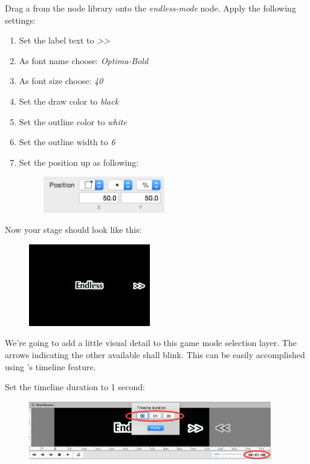 \begin{leftbar}
Drag a \cclabel{} from the node library onto the \textit{endless-mode} node.
Apply the following settings:
\begin{enumerate}
  \item Set the label text to \textit{>>}
  \item As font name choose: \textit{Optima-Bold}
  \item As font size choose: \textit{40}
  \item Set the draw color to \textit{black}
  \item Set the outline color to \textit{white}
  \item Set the outline width to \textit{6}
  \item Set the position up as following: \begin{figure}[H]
										  \centering
										  \includegraphics[width=150pt]{images/Chapter7/arrow_label_position.png}
										  \end{figure}
\end{enumerate}
\end{leftbar}

Now your stage should look like this:
\begin{figure}[H]
\centering
\includegraphics[width=150pt]{images/Chapter7/endless_mode.png}
\end{figure}
We're going to add a little visual detail to this game mode selection layer. The
arrows indicating the other available shall blink. This can be easily
accomplished using \SB{}'s timeline feature. 

\begin{leftbar}
Set the timeline duration to 1 second:
\begin{figure}[H]
\centering
\includegraphics[width=300pt]{images/Chapter7/timeline_duration.png}
\end{figure}
\end{leftbar}

